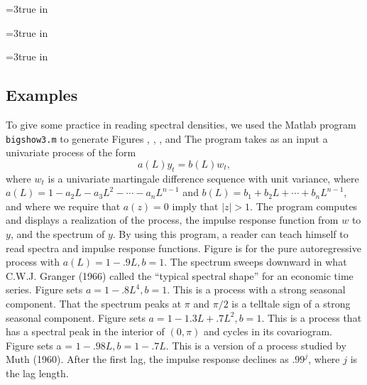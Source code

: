 \vfill\eject






  \centerline{\epsfxsize=3true
in} \caption{Impulse response, spectrum,
covariogram, and sample path of process $(1 - .9L) y_t = w_t $.}
\endfigure


\centerline{\epsfxsize=3true in}
\caption{Impulse response, spectrum, covariogram, and
sample path
 of process $(1 - .8L^4) y_t = w_t $.}
\endfigure


 \centerline{\epsfxsize=3true
in} \caption{Impulse response, spectrum,
covariogram, and sample path of process $(1 - .98L) y_t =(1 - .7L)
w_t $.} 
\endfigure

\subsection{Examples}
To give some practice in reading spectral densities,
we used the Matlab program {\tt bigshow3.m}  to generate
Figures , , , and 
 The program takes as an input a univariate process of the
form
$$ a(L) y_t = b(L) w_t,$$
where $w_t$ is a univariate martingale difference sequence with
unit variance, where $a(L) = 1 - a_2 L - a_3 L^2 - \cdots - a_n
L^{n-1}$ and $b(L) = b_1 +  b_2 L + \cdots + b_n L^{n-1}$, and
where we require that $a(z)=0 $ imply that $| z | > 1$.   The
program computes and displays a realization of the process, the
impulse response function from $w$ to $y$, and the spectrum of
$y$. By using this program, a reader can teach himself to read
spectra and impulse response functions. Figure  is for the pure
autoregressive process with $a(L) = 1 -.9L, b=1$. The spectrum
sweeps downward in what C.W.J. Granger (1966) called the ``typical
spectral shape'' for an economic time series.
 Figure  sets $a=1-.8L^4, b=1$.  This is a process with
a strong seasonal component.  That the spectrum
peaks at $\pi$ and $\pi/2$ is a  telltale sign of
a strong seasonal component. Figure  sets
$a=1 -1.3 L + .7L^2, b=1$.  This
is a process that has a spectral peak in the interior of $(0, \pi)$ and cycles in its
covariogram.
Figure  sets a = $1-.98L, b = 1 -.7L$.  This
is a version of a process studied by Muth (1960).  After the first
lag, the impulse response declines as $.99^j$, where
$j$ is the lag length.
%
\medskip



